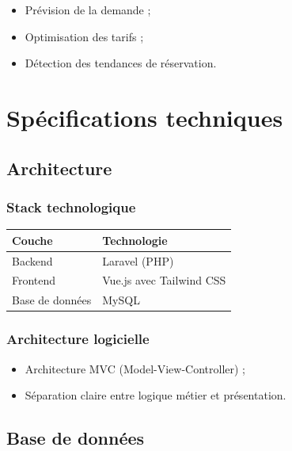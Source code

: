 \documentclass[12pt,a4paper]{report}
\begin{document}
\begin{itemize}
  \item Prévision de la demande ;
  \item Optimisation des tarifs ;
  \item Détection des tendances de réservation.
\end{itemize}

\chapter{Spécifications techniques}

\section{Architecture}

\subsection{Stack technologique}

\begin{center}
\begin{tabular}{ll}
  \toprule
  \textbf{Couche}   & \textbf{Technologie}                    \\
  \midrule
  Backend           & Laravel (PHP)                           \\
  Frontend          & Vue.js avec Tailwind CSS                \\
  Base de données   & MySQL                                   \\
  \bottomrule
\end{tabular}
\end{center}

\subsection{Architecture logicielle}

\begin{itemize}
  \item Architecture MVC (Model-View-Controller) ;
  \item Séparation claire entre logique métier et présentation.
\end{itemize}

\section{Base de données}
\end{document}
